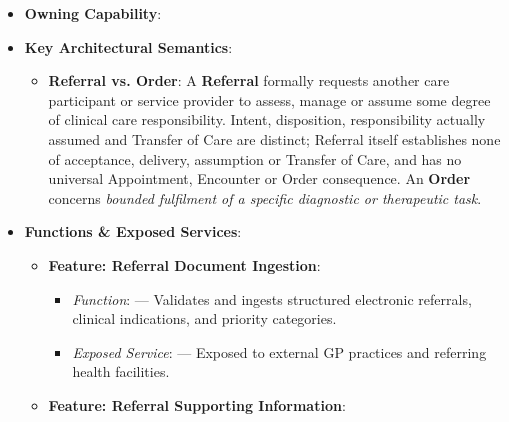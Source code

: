 \begin{itemize}

\item
\textbf{Owning Capability}: \texttt{}



\item
\textbf{Key Architectural Semantics}:


\begin{itemize}

\item
\textbf{Referral vs. Order}: A \textbf{Referral} formally requests another care participant or service provider to assess, manage or assume some degree of clinical care responsibility. Intent, disposition, responsibility actually assumed and Transfer of Care are distinct; Referral itself establishes none of acceptance, delivery, assumption or Transfer of Care, and has no universal Appointment, Encounter or Order consequence. An \textbf{Order} concerns \emph{bounded fulfilment of a specific diagnostic or therapeutic task}.



\end{itemize}


\item
\textbf{Functions \& Exposed Services}:


\begin{itemize}

\item
\textbf{Feature: Referral Document Ingestion}:


\begin{itemize}

\item
\emph{Function}: \texttt{} — Validates and ingests structured electronic referrals, clinical indications, and priority categories.



\item
\emph{Exposed Service}: \texttt{} — Exposed to external GP practices and referring health facilities.



\end{itemize}


\item
\textbf{Feature: Referral Supporting Information}:


\begin{itemize}


\end{itemize}
\end{itemize}
\end{itemize}

